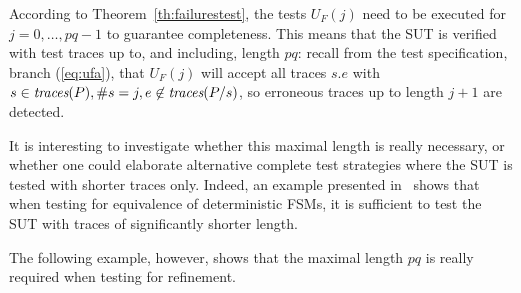 According to Theorem~\ref{th:failurestest}, the tests $U_F(j)$ need to be
executed for $j = 0,\dots,pq-1$ to guarantee completeness. 
 This means that the SUT is verified with test
traces up to, and including, length $pq$: recall from the test specification,
branch (\ref{eq:ufa}), that $U_F(j)$ will accept all traces $s.e$ with
$s\in\text{\it traces}(P), \#s = j, e\not\in\text{\it traces}(P/s)$, so erroneous traces up to length
$j+1$ are detected.

It is interesting to investigate whether this maximal length is really
necessary, or whether one could elaborate alternative complete test
strategies where the SUT is tested with shorter traces only. Indeed, an
example  presented in~\cite[Exercise~5]{PeleskaHuangLectureNotesMBT} shows
that when testing for equivalence of deterministic FSMs, it is sufficient to
test the SUT with traces of significantly shorter length.

The following example, however, shows that the maximal length $pq$ is really
required when testing for refinement.
%
%
%

